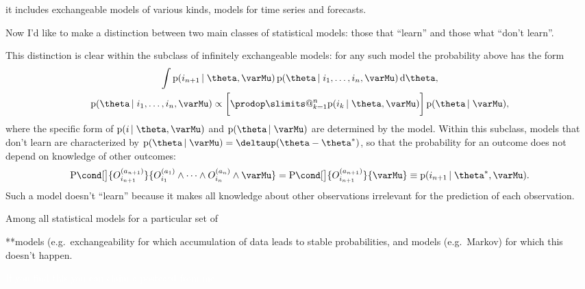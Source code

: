 \documentclass[\ifafour a4paper,12pt,\else a5paper,10pt,\fi%
onecolumn,oneside,article,%
british%
]{memoir}
\makeatletter
\theoremstyle{remark}
\theoremstyle{innote}
\def\prod{\DOTSI\prodop\slimits@}
\newcommand*{\delt}{\deltaup}%
\newcommand*{\di}{\mathrm{d}}%
\newcommand*{\pf}{\mathrm{p}}%
\newcommand*{\p}{\mathrm{P}}%
\renewcommand*{\|}{\nonscript\,\vert\nonscript\;\mathopen{}}
\newcommand*{\eg}{{e.g.}}
\newcommand*{\yO}[2]{O^{(#1)}_{#2}}
\newcommand*{\yM}{\varMu}
\newcommand*{\ytheta}{\theta^*}
\makeatother
\begin{document}
it includes exchangeable models of various
kinds, models for time series and forecasts.

\medskip

Now I'd like to make a distinction between two main classes of statistical
models: those that \enquote{learn} and those what \enquote{don't learn}.

This distinction is clear within the subclass of infinitely exchangeable
models: for any such model the probability above has the form
\begin{subequations} \label{eq:example_exchangeable}
  \begin{gather}
    \int \pf(i_{n+1} \| \theta,\yM)\,
    \pf(\theta \| i_{1}, \dotsc, i_{n}, \yM)\,\di\theta,
    \\
    \pf(\theta \| i_{1}, \dotsc, i_{n}, \yM) \propto
    \biggl[  \prod_{k=1}^n \pf(i_{k} \| \theta,\yM)  \biggr]
    \,
    \pf(\theta \|\yM), 
  \end{gather}
\end{subequations}
where the specific form of $\pf(i \| \theta,\yM)$ and $\pf(\theta \|\yM)$
are determined by the model. Within this subclass, models that don't learn
are characterized by $\pf(\theta \|\yM) = \delt(\theta-\ytheta)$, so that
the probability for an outcome does not depend on knowledge of other outcomes:
\begin{equation}
  \label{eq:extreme_exchang}
  \p\cond[\big]{\yO{a_{n+1}}{i_{n+1}}}{
  \yO{a_{1}}{i_{1}} \land \dotsb \land \yO{a_{n}}{i_{n}} \land \yM }
  =
  \p\cond[\big]{\yO{a_{n+1}}{i_{n+1}} }{ \yM}
  \equiv \pf(i_{n+1} \| \ytheta,\yM).
\end{equation}
Such a model doesn't \enquote{learn} because it makes all knowledge about
other observations irrelevant for the prediction of each observation.



Among all statistical models for a particular set of 

**models (\eg\ exchangeability for which accumulation of data leads to
stable probabilities, and models (\eg\ Markov) for which this doesn't
happen.


\textcolor{white}{If you find this you can claim a postcard from me.}
%

\setlength{\intextsep}{0.5ex}%
\end{document}
